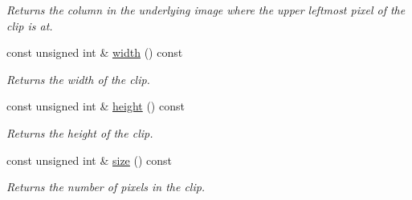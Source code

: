 \begin{CompactItemize}
\begin{CompactList}\small\item\em Returns the column in the underlying image where the upper leftmost pixel of the clip is at. \item\end{CompactList}\item 
const unsigned int \& \hyperlink{class_clip_88d1a47c0ec077e8c6680785509389b0}{width} () const 
\begin{CompactList}\small\item\em Returns the width of the clip. \item\end{CompactList}\item 
const unsigned int \& \hyperlink{class_clip_939908a8dde602d25335792cc0fd5d97}{height} () const 
\begin{CompactList}\small\item\em Returns the height of the clip. \item\end{CompactList}\item 
const unsigned int \& \hyperlink{class_clip_eb6b12a1a0570b529d6a09633b991fcd}{size} () const 
\begin{CompactList}\small\item\em Returns the number of pixels in the clip. \item\end{CompactList}\end{CompactItemize}
